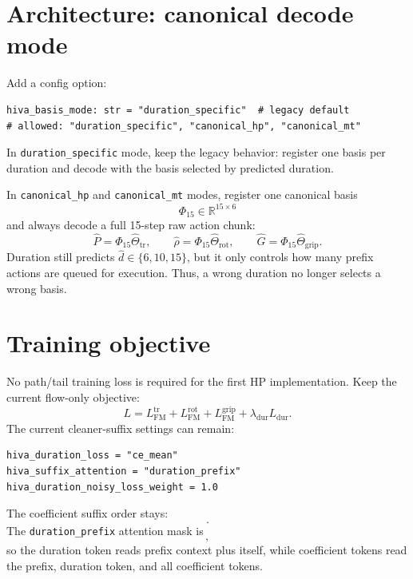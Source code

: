 \documentclass[11pt]{article}
\begin{document}
\section{Architecture: canonical decode mode}
Add a config option:
\begin{lstlisting}
hiva_basis_mode: str = "duration_specific"  # legacy default
# allowed: "duration_specific", "canonical_hp", "canonical_mt"
\end{lstlisting}

In \texttt{duration\_specific} mode, keep the legacy behavior: register one basis per duration and decode with the basis selected by predicted duration.

In \texttt{canonical\_hp} and \texttt{canonical\_mt} modes, register one canonical basis
\begin{equation}
\Phi_{15}\in\mathbb{R}^{15\times 6}
\end{equation}
and always decode a full 15-step raw action chunk:
\begin{equation}
\hat P=\Phi_{15}\hat\Theta_{\mathrm{tr}},\qquad
\hat\rho=\Phi_{15}\hat\Theta_{\mathrm{rot}},\qquad
\hat G=\Phi_{15}\hat\Theta_{\mathrm{grip}}.
\end{equation}
Duration still predicts \(\hat d\in\{6,10,15\}\), but it only controls how many prefix actions are queued for execution.  Thus, a wrong duration no longer selects a wrong basis.

\section{Training objective}
No path/tail training loss is required for the first HP implementation.  Keep the current flow-only objective:
\begin{equation}
L=L_{\mathrm{FM}}^{\mathrm{tr}}+L_{\mathrm{FM}}^{\mathrm{rot}}+L_{\mathrm{FM}}^{\mathrm{grip}}+\lambda_{\mathrm{dur}}L_{\mathrm{dur}}.
\end{equation}
The current cleaner-suffix settings can remain:
\begin{lstlisting}
hiva_duration_loss = "ce_mean"
hiva_suffix_attention = "duration_prefix"
hiva_duration_noisy_loss_weight = 1.0
\end{lstlisting}
The coefficient suffix order stays:
\begin{equation}
[\texttt{duration}][\texttt{translation coeffs}][\texttt{rotation coeffs}][\texttt{gripper coeffs}].
\end{equation}
The \texttt{duration\_prefix} attention mask is
\begin{equation}
[1,1,0,\ldots,0],
\end{equation}
so the duration token reads prefix context plus itself, while coefficient tokens read the prefix, duration token, and all coefficient tokens.
\end{document}
